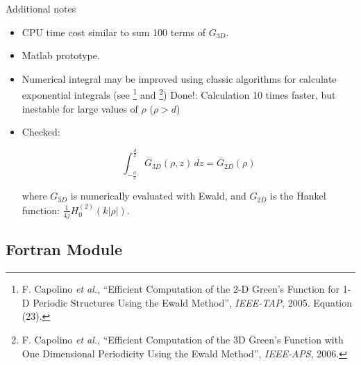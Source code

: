 \begin{frame}{Additional notes}
  \begin{itemize}
    \item CPU time cost similar to sum 100 terms of $G_{3D}$.
    \item Matlab prototype.
    \item Numerical integral may be improved using classic algorithms for 
      calculate exponential integrals (see %
        \footnote{
          F. Capolino \emph{et al.}, ``Efficient Computation of the 2-D Green's 
          Function for 1-D Periodic Structures Using the Ewald Method'', 
          \emph{IEEE-TAP}, 2005. Equation (23).
        } and
        \footnote{
          F. Capolino \emph{et al.}, ``Efficient Computation of the 3D Green's 
          Function with One Dimensional Periodicity Using the Ewald Method'', 
          \emph{IEEE-APS}, 2006.
        })
      {\color{red} Done!: Calculation 10 times faster, but inestable for large 
      values of $\rho$ ($\rho>d$)}
    \item
      Checked:

      \[
        \int_{-\frac{d}{2}}^{\frac{d}{2}}
        G_{3D}(\rho,z)\, dz
        =
        G_{2D}(\rho)
      \]

      where $G_{3D}$ is numerically evaluated with Ewald, and $G_{2D}$ is the 
      Hankel function: 
      $\frac{1}{4j} H_0^{(2)}(k|\rho|)$.

  \end{itemize}
\end{frame}


  \subsection{Fortran Module}


